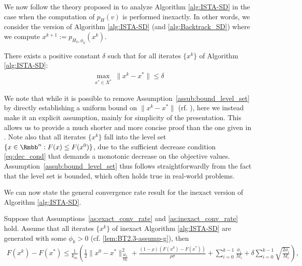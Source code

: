 \documentclass[11pt]{article}
\numberwithin{equation}{section}
\begin{document}
We now follow the theory proposed in  \cite{Schmidtetal} to analyze Algorithm \ref{alg:ISTA-SD}  in the case when the computation of $p_H( v)$ is performed inexactly. 
In other words, we consider the version of Algorithm \ref{alg:ISTA-SD} (and \ref{alg:Backtrack_SD}) where we compute 
$x^{k+1}  := p_{H_k, \phi_k}(x^k)$.

\begin{assumption}\leavevmode %
\label{as:inexact_conv_rate}
	\assume
	\label{assub:bound_level_set}
	There exists a positive constant $\delta$ such that for all iterates $\{x^k\}$ of Algorithm \ref{alg:ISTA-SD}:
	\begin{align*}
	     \max_{x^* \in X^*}~\|x^k - x^*\| \leq \delta
	\end{align*} 
\end{assumption}
We note that while it is possible to remove Assumption~\ref{assub:bound_level_set} by directly establishing a uniform bound on $\|x^k - x^*\|$ (rf. \cite{OML,Schmidtetal}), here we instead make it an explicit assumption, mainly for simplicity of the presentation. This allows us to provide a much shorter and more concise proof than the one given in \cite{OML}. 
Note also that all iterates $\{x^k\}$ fall into the level set $\{x \in \Rmbb^n: F(x) \leq F(x^0)\}$, due to the sufficient decrease condition \eqref{eq:dec_cond} that demands a monotonic decrease on the objective values. Assumption~\ref{assub:bound_level_set} thus follows straightforwardly from the fact that the level set is bounded, which often holds true in real-world problems.

We can now state the general convergence rate result for the inexact version of Algorithm \ref{alg:ISTA-SD}.

\begin{theorem}\label{th:inexact_conv_rate}
Suppose that Assumptions~\ref{as:exact_conv_rate} and \ref{as:inexact_conv_rate} hold. 
Assume that all iterates $\{x^k\}$ of inexact Algorithm \ref{alg:ISTA-SD} are generated with some $\phi_k>0$ (cf. \eqref{lem:BT2.3-assump-g}), then
\begin{align}
    \label{eq:bound_F_F*}
    F(x^k) - F(x^*) \leq 
    \frac{1}{k_m} \left( \frac{1}{2} \|x^0-x^*\|_{\frac{H_0}{M_0}}^2 
    + \frac{(1-\rho)(F(x^0)-F(x^*))}{\rho\sigma} 
    + \sum_{i=0}^{k-1}\frac{\phi_i}{M_i}
    + \delta\sum_{i=0}^{k-1} \sqrt{\frac{2\phi_i}{M_i}} \right),
\end{align}
\end{theorem}
\end{document}
